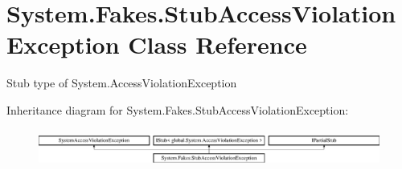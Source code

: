 \hypertarget{class_system_1_1_fakes_1_1_stub_access_violation_exception}{\section{System.\-Fakes.\-Stub\-Access\-Violation\-Exception Class Reference}
\label{class_system_1_1_fakes_1_1_stub_access_violation_exception}
}


Stub type of System.\-Access\-Violation\-Exception 


Inheritance diagram for System.\-Fakes.\-Stub\-Access\-Violation\-Exception\-:\begin{figure}[H]
\begin{center}
\leavevmode
\includegraphics[height=1.244444cm]{class_system_1_1_fakes_1_1_stub_access_violation_exception}
\end{center}
\end{figure}
